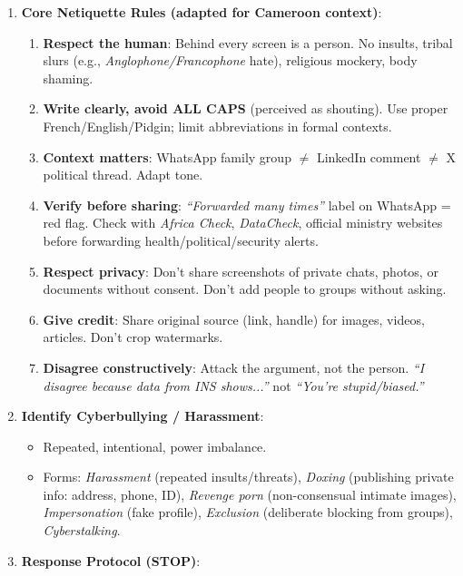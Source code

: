 \documentclass[11pt]{article}
\begin{document}
\begin{methode}
\begin{enumerate}
    \item \textbf{Core Netiquette Rules (adapted for Cameroon context)}:
          \begin{enumerate}
              \item \textbf{Respect the human}: Behind every screen is a person. No insults, tribal slurs (e.g., \textit{Anglophone/Francophone} hate), religious mockery, body shaming.
              \item \textbf{Write clearly, avoid ALL CAPS} (perceived as shouting). Use proper French/English/Pidgin; limit abbreviations in formal contexts.
              \item \textbf{Context matters}: WhatsApp family group $\neq$ LinkedIn comment $\neq$ X political thread. Adapt tone.
              \item \textbf{Verify before sharing}: \textit{``Forwarded many times''} label on WhatsApp = red flag. Check with \textit{Africa Check}, \textit{DataCheck}, official ministry websites before forwarding health/political/security alerts.
              \item \textbf{Respect privacy}: Don't share screenshots of private chats, photos, or documents without consent. Don't add people to groups without asking.
              \item \textbf{Give credit}: Share original source (link, handle) for images, videos, articles. Don't crop watermarks.
              \item \textbf{Disagree constructively}: Attack the argument, not the person. \textit{``I disagree because data from INS shows...''} not \textit{``You're stupid/biased.''}
          \end{enumerate}
    \item \textbf{Identify Cyberbullying / Harassment}:
          \begin{itemize}
              \item Repeated, intentional, power imbalance.
              \item Forms: \textit{Harassment} (repeated insults/threats), \textit{Doxing} (publishing private info: address, phone, ID), \textit{Revenge porn} (non-consensual intimate images), \textit{Impersonation} (fake profile), \textit{Exclusion} (deliberate blocking from groups), \textit{Cyberstalking}.
          \end{itemize}
    \item \textbf{Response Protocol (STOP)}:

\end{enumerate}
\end{methode}
\end{document}
